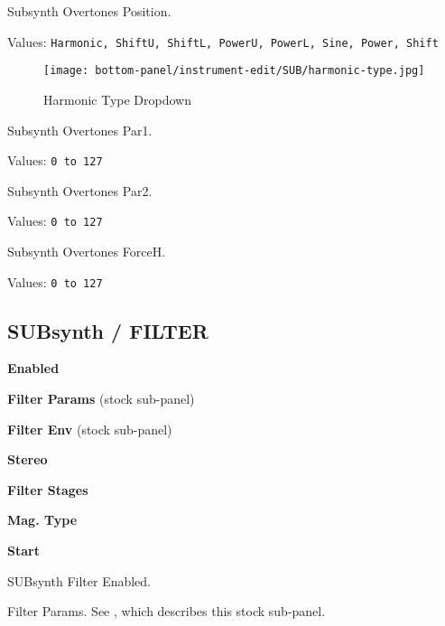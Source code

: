    \setcounter{ItemCounter}{0}      %

   Subsynth Overtones Position.

   Values: \texttt{Harmonic, ShiftU, ShiftL, PowerU, PowerL, Sine, Power, Shift}

\begin{figure}[H]
   \centering
   \texttt{[image: bottom-panel/instrument-edit/SUB/harmonic-type.jpg]}
   \caption{Harmonic Type Dropdown}
   \label{fig:harmonic_type_dropdown}
\end{figure}

   Subsynth Overtones Par1.

   Values: \texttt{0 to 127}

   Subsynth Overtones Par2.

   Values: \texttt{0 to 127}

   Subsynth Overtones ForceH.

   Values: \texttt{0 to 127}

\subsection{SUBsynth / FILTER}
\label{subsec:subsynth_filter}

   \begin{enumber}
      \item \textbf{Enabled}
      \item \textbf{Filter Params} (stock sub-panel)
      \item \textbf{Filter Env} (stock sub-panel)
      \item \textbf{Stereo}
      \item \textbf{Filter Stages}
      \item \textbf{Mag. Type}
      \item \textbf{Start}
   \end{enumber}

   \setcounter{ItemCounter}{0}      %

   SUBsynth Filter Enabled.

   Filter Params.  See
   ,
   which describes this stock sub-panel.

